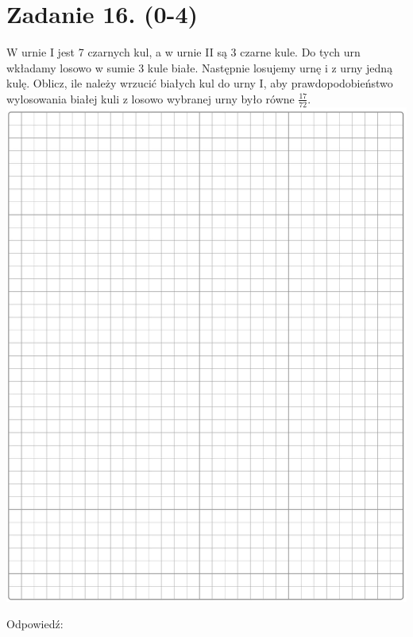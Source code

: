 \documentclass[10pt]{article}
\begin{document}
\section*{Zadanie 16. (0-4)}
W urnie I jest 7 czarnych kul, a w urnie II są 3 czarne kule. Do tych urn wkładamy losowo w sumie 3 kule białe. Następnie losujemy urnę i z urny jedną kulę. Oblicz, ile należy wrzucić białych kul do urny I, aby prawdopodobieństwo wylosowania białej kuli z losowo wybranej urny było równe \(\frac{17}{72}\).\\
\includegraphics[max width=\textwidth, center]{2024_11_21_06df787f12c5337a1fe8g-13}

Odpowiedź:
\end{document}
